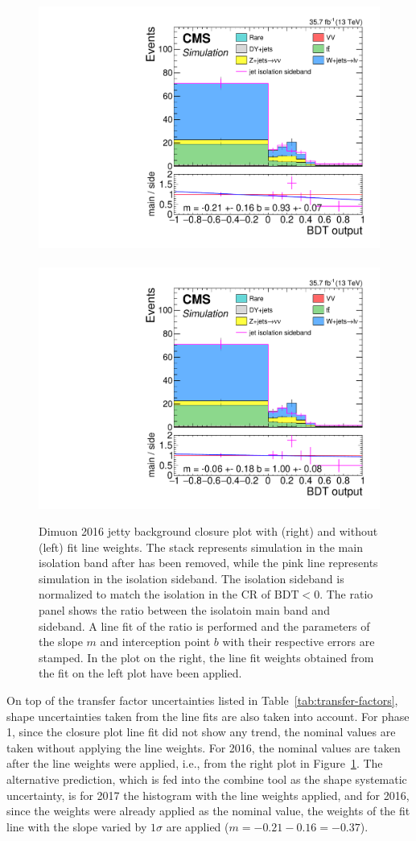 \begin{figure}[!htb]
\centering
\includegraphics[width=0.48\linewidth]{plots/dilepton_muons_bg_isocr_no_retag_CorrJetNoMultIso10_06_2016_no_norm_sf/none_closure_dilepBDTphase1CorrJetNoMultIso10Dr0.6.pdf} \,
\includegraphics[width=0.48\linewidth]{plots/dilepton_muons_bg_isocr_no_retag_CorrJetNoMultIso10_06_2016_no_norm_sf_line_fit_line_weights/none_closure_dilepBDTphase1CorrJetNoMultIso10Dr0.6.pdf} 
 \\

\caption[Dimuon 2016 jetty background closure plots with and without fit line weights]{Dimuon 2016 jetty background closure plot with (right) and without (left) fit line weights. The stack represents simulation in the main isolation band after \ztautau has been removed, while the pink line represents simulation in the isolation sideband. The isolation sideband is normalized to match the isolation in the CR of $\mathrm{BDT} < 0$. The ratio panel shows the ratio between the isolatoin main band and sideband. A line fit of the ratio is performed and the parameters of the slope $m$ and interception point $b$ with their respective errors are stamped. In the plot on the right, the line fit weights obtained from the fit on the left plot have been applied.}
\label{fig:dimuon-bdt-jetty-2016-closure}
\end{figure}

On top of the transfer factor uncertainties listed in Table~\ref{tab:transfer-factors}, shape uncertainties taken from the line fits are also taken into account. For phase 1, since the closure plot line fit did not show any trend, the nominal values are taken without applying the line weights. For 2016, the nominal values are taken after the line weights were applied, i.e., from the right plot in Figure~\ref{fig:dimuon-bdt-jetty-2016-closure}. The alternative prediction, which is fed into the combine tool as the shape systematic uncertainty, is for 2017 the histogram with the line weights applied, and for 2016, since the weights were already applied as the nominal value, the weights of the fit line with the slope varied by $1\sigma$ are applied ($m=-0.21-0.16=-0.37$).



